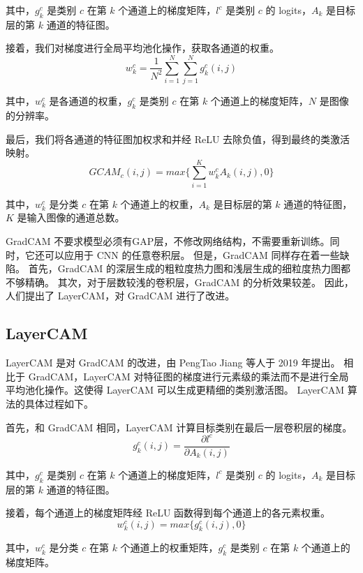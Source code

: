 \documentclass[supercite]{Experimental_Report}
\theoremstyle{definition}
\begin{document}
其中，$g_k^c$ 是类别 $c$ 在第 $k$ 个通道上的梯度矩阵，$l^c$ 是类别 $c$ 的 logits，$A_k$ 是目标层的第 $k$ 通道的特征图。

接着，我们对梯度进行全局平均池化操作，获取各通道的权重。
\begin{equation}
w_k^c=\frac{1}{N^2}\sum_{i=1}^{N}\sum_{j=1}^{N}g_k^c(i, j)
\end{equation}

其中，$w_k^c$ 是各通道的权重，$g_k^c$ 是类别 $c$ 在第 $k$ 个通道上的梯度矩阵，$N$ 是图像的分辨率。

最后，我们将各通道的特征图加权求和并经 ReLU 去除负值，得到最终的类激活映射。
\begin{equation}
GCAM_c(i, j)=max\{\sum_{i=1}^{K}w_k^cA_k(i, j), 0\}
\end{equation}

其中，$w_k^c$ 是分类 $c$ 在第 $k$ 个通道上的权重，$A_k$ 是目标层的第 $k$ 通道的特征图，$K$ 是输入图像的通道总数。

GradCAM 不要求模型必须有GAP层，不修改网络结构，不需要重新训练。同时，它还可以应用于 CNN 的任意卷积层。
但是，GradCAM 同样存在着一些缺陷。
首先，GradCAM 的深层生成的粗粒度热力图和浅层生成的细粒度热力图都不够精确。
其次，对于层数较浅的卷积层，GradCAM 的分析效果较差。
因此，人们提出了 LayerCAM，对 GradCAM 进行了改进。

\subsection{LayerCAM}
LayerCAM 是对 GradCAM 的改进，由 PengTao Jiang 等人于 2019 年提出。
相比于 GradCAM，LayerCAM 对特征图的梯度进行元素级的乘法而不是进行全局平均池化操作。这使得 LayerCAM 可以生成更精细的类别激活图。
LayerCAM 算法的具体过程如下。

首先，和 GradCAM 相同，LayerCAM 计算目标类别在最后一层卷积层的梯度。
\begin{equation}
g_k^c(i, j) = \frac{\partial l^c}{\partial A_k(i, j)}
\end{equation}

其中，$g_k^c$ 是类别 $c$ 在第 $k$ 个通道上的梯度矩阵，$l^c$ 是类别 $c$ 的 logits，$A_k$ 是目标层的第 $k$ 通道的特征图。

接着，每个通道上的梯度矩阵经 ReLU 函数得到每个通道上的各元素权重。
\begin{equation}
w_k^c(i,j)=max\{g_k^c(i,j),0\}
\end{equation}

其中，$w_k^c$ 是分类 $c$ 在第 $k$ 个通道上的权重矩阵，$g_k^c$ 是类别 $c$ 在第 $k$ 个通道上的梯度矩阵。
\end{document}
